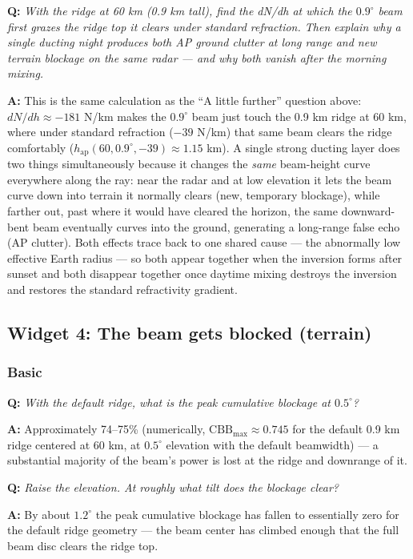 \documentclass[11pt]{article}
\newenvironment{qa}[1]{\par\noindent\textbf{\color{qgray}Q: }\emph{#1}\par\noindent\textbf{A: }}{\par\vspace{6pt}}
\newcommand{\tier}[1]{\subsubsection*{#1}}
\begin{document}
\begin{qa}{With the ridge at 60 km (0.9 km tall), find the dN/dh at which the $0.9^\circ$ beam first grazes the ridge top it clears under standard refraction. Then explain why a single ducting night produces both AP ground clutter at long range and new terrain blockage on the same radar --- and why both vanish after the morning mixing.}
This is the same calculation as the ``A little further'' question above: $dN/dh\approx-181$ N/km makes the $0.9^\circ$ beam just touch the 0.9 km ridge at 60 km, where under standard refraction ($-39$ N/km) that same beam clears the ridge comfortably ($h_{\mathrm{ap}}(60,0.9^\circ,-39)\approx1.15$ km). A single strong ducting layer does two things simultaneously because it changes the \emph{same} beam-height curve everywhere along the ray: near the radar and at low elevation it lets the beam curve down into terrain it normally clears (new, temporary blockage), while farther out, past where it would have cleared the horizon, the same downward-bent beam eventually curves into the ground, generating a long-range false echo (AP clutter). Both effects trace back to one shared cause --- the abnormally low effective Earth radius --- so both appear together when the inversion forms after sunset and both disappear together once daytime mixing destroys the inversion and restores the standard refractivity gradient.
\end{qa}

\subsection{Widget 4: The beam gets blocked (terrain)}

\tier{Basic}
\begin{qa}{With the default ridge, what is the peak cumulative blockage at $0.5^\circ$?}
Approximately 74--75\% (numerically, $\mathrm{CBB}_{\max}\approx0.745$ for the default 0.9 km ridge centered at 60 km, at $0.5^\circ$ elevation with the default beamwidth) --- a substantial majority of the beam's power is lost at the ridge and downrange of it.
\end{qa}
\begin{qa}{Raise the elevation. At roughly what tilt does the blockage clear?}
By about $1.2^\circ$ the peak cumulative blockage has fallen to essentially zero for the default ridge geometry --- the beam center has climbed enough that the full beam disc clears the ridge top.
\end{qa}
\end{document}
